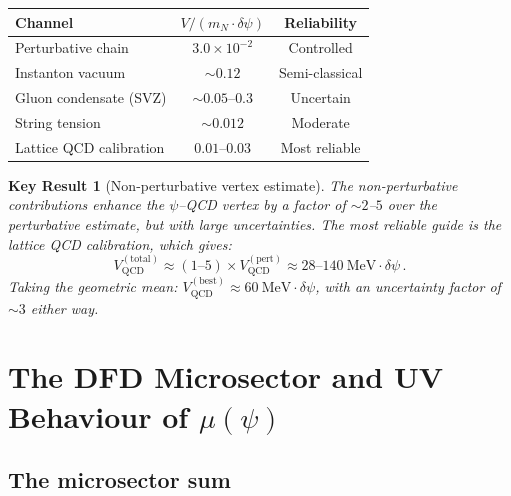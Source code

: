 \documentclass[aps,prd,twocolumn,superscriptaddress,floatfix,nofootinbib]{revtex4-2}
\newcommand{\mufunction}{\mu}
\newcommand{\mN}{m_N}
\newcommand{\dpsi}{\delta\psi}
\newtheorem{result}{Key Result}
\begin{document}
\begin{center}
\renewcommand{\arraystretch}{1.3}
\begin{tabular}{lcc}
\toprule
\textbf{Channel} & $V / (\mN \cdot \dpsi)$ & \textbf{Reliability} \\
\midrule
Perturbative chain & $3.0 \times 10^{-2}$ & Controlled \\
Instanton vacuum & $\sim 0.12$ & Semi-classical \\
Gluon condensate (SVZ) & $\sim 0.05$--$0.3$ & Uncertain \\
String tension & $\sim 0.012$ & Moderate \\
Lattice QCD calibration & $0.01$--$0.03$ & Most reliable \\
\bottomrule
\end{tabular}
\end{center}

\begin{result}[Non-perturbative vertex estimate]
The non-perturbative contributions enhance the $\psi$--QCD vertex by a
factor of $\sim 2$--$5$ over the perturbative estimate, but with large
uncertainties. The most reliable guide is the lattice QCD calibration, which
gives:
\begin{equation}
V_{\mathrm{QCD}}^{(\mathrm{total})} \approx (1\text{--}5) \times
V_{\mathrm{QCD}}^{(\mathrm{pert})} \approx 28\text{--}140~\text{MeV}
\cdot \dpsi \, .
\end{equation}
Taking the geometric mean: $V_{\mathrm{QCD}}^{(\mathrm{best})} \approx
60~\text{MeV} \cdot \dpsi$, with an uncertainty factor of $\sim 3$ either
way.
\end{result}


\section{The DFD Microsector and UV Behaviour of $\mufunction(\psi)$}
\label{sec:microsector}

\subsection{The microsector sum}\label{sec:microsector_sum}
\end{document}
